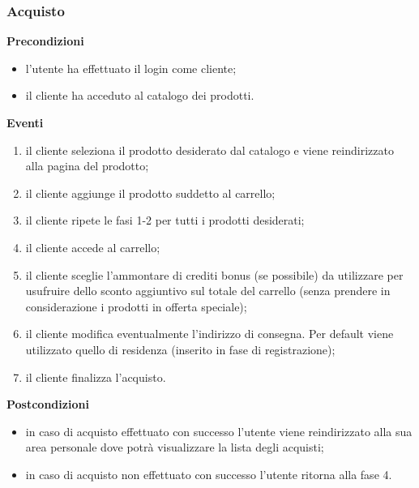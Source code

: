 \documentclass[a4paper, 14pt]{article}
\begin{document}
\begin{flushleft}
			\subsubsection{Acquisto}
			\textbf{Precondizioni}
			\begin{itemize}
				\item l'utente ha effettuato il login come cliente;
				\item il cliente ha acceduto al catalogo dei prodotti.
			\end{itemize}
			\textbf{Eventi}
			\begin{enumerate}
				\item il cliente seleziona il prodotto desiderato dal catalogo e viene reindirizzato alla pagina del prodotto;
				\item il cliente aggiunge il prodotto suddetto al carrello;
				\item il cliente ripete le fasi 1-2 per tutti i prodotti desiderati;
				\item il cliente accede al carrello;
				\item il cliente sceglie l'ammontare di crediti bonus (se possibile) da utilizzare per usufruire dello sconto aggiuntivo
				      sul totale del carrello (senza prendere in considerazione i prodotti in offerta speciale);
				\item il cliente modifica eventualmente l'indirizzo di consegna. Per default viene utilizzato quello di residenza (inserito 
					  in fase di registrazione);
				\item il cliente finalizza l'acquisto.
			\end{enumerate}
			\textbf{Postcondizioni}
			\begin{itemize}
				\item in caso di acquisto effettuato con successo l'utente viene reindirizzato alla sua area personale dove potrà visualizzare la lista degli acquisti;
				\item in caso di acquisto non effettuato con successo l'utente ritorna alla fase 4.
			\end{itemize}
		
			\bigskip

\end{flushleft}
\end{document}
